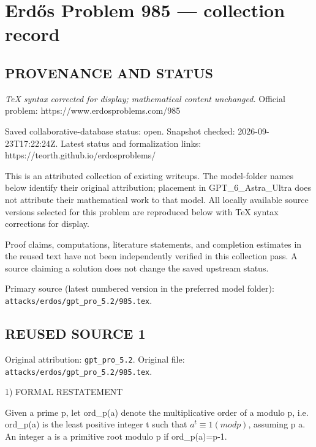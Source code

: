 \section*{Erd\H{o}s Problem 985 --- collection record}

\subsection*{PROVENANCE AND STATUS}

\emph{TeX syntax corrected for display; mathematical content unchanged.}
Official problem: https://www.erdosproblems.com/985

Saved collaborative-database status: open.
Snapshot checked: 2026-09-23T17:22:24Z.
Latest status and formalization links: https://teorth.github.io/erdosproblems/

This is an attributed collection of existing writeups. The model-folder names below identify their original attribution; placement in GPT\_6\_Astra\_Ultra does not attribute their mathematical work to that model. All locally available source versions selected for this problem are reproduced below with TeX syntax corrections for display.

Proof claims, computations, literature statements, and completion estimates in the reused text have not been independently verified in this collection pass. A source claiming a solution does not change the saved upstream status.

Primary source (latest numbered version in the preferred model folder): \texttt{attacks/erdos/gpt\_pro\_5.2/985.tex}.

\subsection*{REUSED SOURCE 1}
Original attribution: \texttt{gpt\_pro\_5.2}.
Original file: \texttt{attacks/erdos/gpt\_pro\_5.2/985.tex}.


1) FORMAL RESTATEMENT

Given a prime p, let ord_p(a) denote the multiplicative order of a modulo p, i.e.
ord_p(a) is the least positive integer t such that \(a^t \equiv 1 (mod p)\), assuming p \nmid a.
An integer a is a primitive root modulo p if ord_p(a)=p-1.

